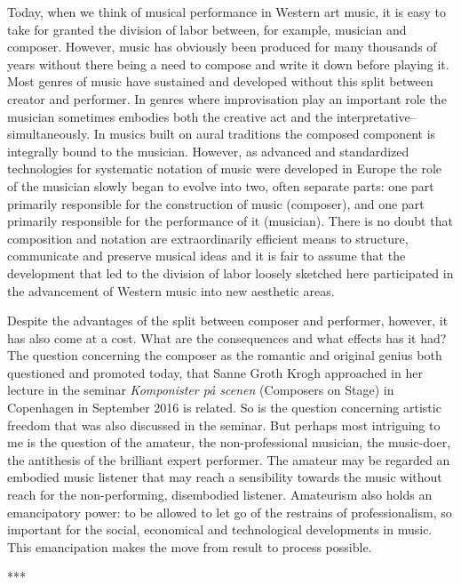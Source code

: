 \documentclass[11pt]{article}
\begin{document}
Today, when we think of musical performance in Western art music, it is easy to take for granted the division of labor between, for example, musician and composer. However, music has obviously been produced for many thousands of years without there being a need to compose and write it down before playing it. Most genres of music have sustained and developed without this split between creator and performer. In genres where improvisation play an important role the musician sometimes embodies both the creative act and the interpretative--simultaneously. In musics built on aural traditions the composed component is integrally bound to the musician. However, as advanced and standardized technologies for systematic notation of music were developed in Europe the role of the musician slowly began to evolve into two, often separate parts: one part primarily responsible for the construction of music (composer), and one part primarily responsible for the performance of it (musician). There is no doubt that composition and notation are extraordinarily efficient means to structure, communicate and preserve musical ideas and it is fair to assume that the development that led to the division of labor loosely sketched here participated in the advancement of Western music into new aesthetic areas.

Despite the advantages of the split between composer and performer, however, it has also come at a cost. What are the consequences and what effects has it had? The question concerning the composer as the romantic and original genius both questioned and promoted today, that Sanne Groth Krogh approached in her lecture in the seminar \emph{Komponister på scenen} (Composers on Stage) in Copenhagen in September 2016 is related. So is the question concerning artistic freedom that was also discussed in the seminar. But perhaps most intriguing to me is the question of the amateur, the non-professional musician, the music-doer, the antithesis of the brilliant expert performer. The amateur may be regarded an embodied music listener that may reach a sensibility towards the music without reach for the non-performing, disembodied listener. Amateurism also holds an emancipatory power: to be allowed to let go of the restrains of professionalism, so important for the social, economical and technological developments in music. This emancipation makes the move from result to process possible.


\vspace{0.4cm}
\begin{center}
  ***
\end{center}
\vspace{0.4cm}
\end{document}
